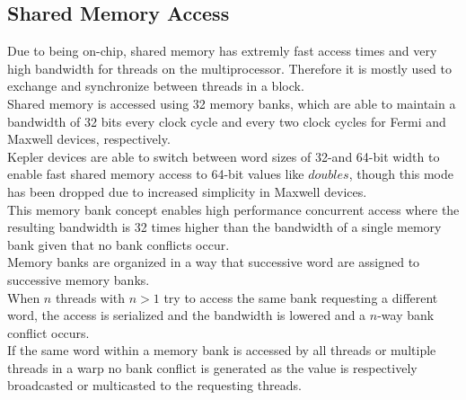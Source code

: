 \subsection{Shared Memory Access}
\label{shared_access}
Due to being on-chip, shared memory has extremly fast access times and very high bandwidth for threads on the multiprocessor. Therefore it is mostly used to exchange and synchronize between threads in a block.\\
Shared memory is accessed using 32 memory banks, which are able to maintain a bandwidth of 32 bits every clock cycle and every two clock cycles for Fermi and Maxwell devices, respectively.\\
Kepler devices are able to switch between word sizes of 32-and 64-bit width to enable fast shared memory access to 64-bit values like $doubles$, though this mode has been dropped due to increased simplicity in Maxwell devices.\\
This memory bank concept enables high performance concurrent access where the resulting bandwidth is 32 times higher than the bandwidth of a single memory bank given that no bank conflicts occur.\\
Memory banks are organized in a way that successive word are assigned to successive memory banks.\\
When $n$ threads with $n>1$ try to access the same bank requesting a different word, the access is serialized and the bandwidth is lowered and a $n$-way bank conflict occurs.\\
If the same word within a memory bank is accessed by all threads or multiple threads in a warp no bank conflict is generated as the value is respectively broadcasted or multicasted to the requesting threads.\\
